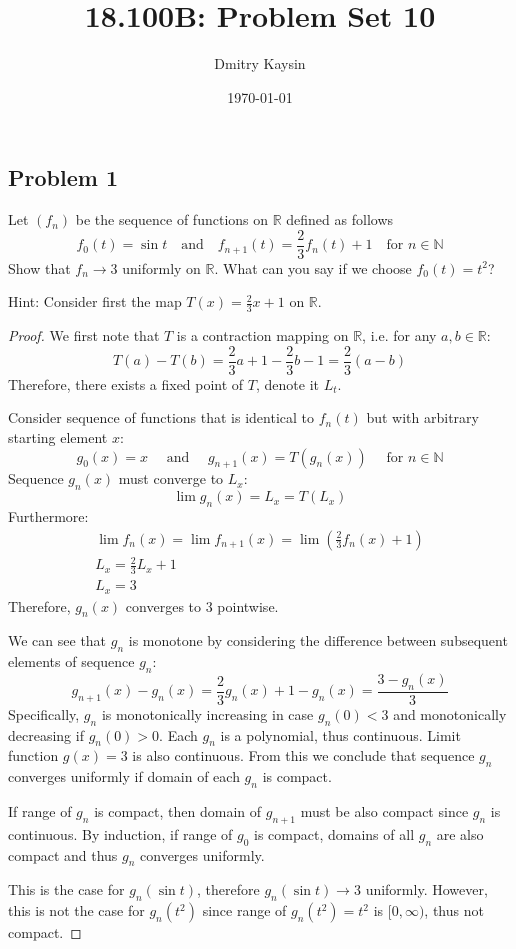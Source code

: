 \documentclass{article}
\title{18.100B: Problem Set 10}
\author{Dmitry Kaysin}
\date\today
\newcommand{\R}{\mathbb{R}}
\newcommand{\N}{\mathbb{N}}
\begin{document}
\maketitle 


\subsection*{Problem 1}

\begin{tcolorbox}
Let $(f_n)$ be the sequence of functions on $\R$ defined as follows
\[ f_0(t) = \sin t \>\>\> \text{ and } \>\>\> f_{n+1}(t) = \frac{2}{3}f_n(t)+1 \>\>\> \text{ for $n \in \N$} \]
Show that $f_n \to 3$ uniformly on $\R$. What can you say if we choose $f_0(t) = t^2$?

Hint: Consider first the map $T(x) = \frac{2}{3}x + 1$ on $\R$.
\end{tcolorbox}

\begin{proof}

We first note that $T$ is a contraction mapping on $\R$, i.e. for any $a,b \in \R$:
\[ T(a) - T(b) = \frac{2}{3}a+1 - \frac{2}{3}b-1 = \frac{2}{3}(a-b) \]
Therefore, there exists a fixed point of $T$, denote it $L_t$.

Consider sequence of functions that is identical to $f_n(t)$ but with arbitrary starting element $x$:
\[ g_0(x) = x \quad \text{ and } \quad g_{n+1}(x) = T(g_n(x)) \quad \text{ for $n \in \N$} \]
Sequence $g_n(x)$ must converge to $L_x$:
\[ \lim g_n(x) = L_x = T(L_x) \]
Furthermore:
\begin{gather*}
    \lim f_{n}(x) = \lim f_{n+1}(x) = \lim \left( \frac{2}{3}f_n(x)+1 \right) \\
    L_x = \frac{2}{3} L_x +1 \\
    L_x = 3    
\end{gather*}
Therefore, $g_n(x)$ converges to $3$ pointwise.

We can see that $g_n$ is monotone by considering the difference between subsequent elements of sequence $g_n$:
\[ g_{n+1}(x) - g_n(x) = \frac{2}{3}g_n(x) + 1 - g_n(x) = \frac{3-g_n(x)}{3} \]
Specifically, $g_n$ is monotonically increasing in case $g_n(0) < 3$ and monotonically decreasing if $g_n(0) > 0$.
Each $g_n$ is a polynomial, thus continuous.
Limit function $g(x)=3$ is also continuous.
From this we conclude that sequence $g_n$ converges uniformly if domain of each $g_n$ is compact.

If range of $g_n$ is compact, then domain of $g_{n+1}$ must be also compact since $g_n$ is continuous.
By induction, if range of $g_0$ is compact, domains of all $g_n$ are also compact and thus $g_n$ converges uniformly.

This is the case for $g_n(\sin t)$, therefore $g_n(\sin t) \to 3$ uniformly.
However, this is not the case for $g_n(t^2)$ since range of $g_n(t^2) = t^2$ is $[0,\infty)$, thus not compact.

\end{proof}
\end{document}
